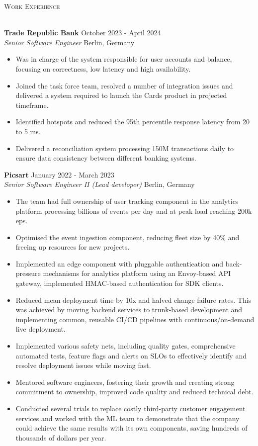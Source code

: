 \documentclass[a4paper]{article}
\newcommand{\lineunder} {
    \vspace*{-8pt} \\
    \hspace*{-18pt} \hrulefill \\
}
\newcommand{\header} [1] {
        {\hspace*{-18pt}\vspace*{6pt} \textsc{#1}}
    \vspace*{-6pt} \lineunder
}
\newcommand{\employer} [4] {
    \textbf{#1} \hfill {#3} \\
    \textit{#2} \hfill {#4} \\
    \vspace{0mm}
}
\begin{document}
    \header{Work Experience}
    \vspace{1mm}

    \employer{Trade Republic Bank}{Senior Software Engineer}{October 2023 - April 2024}{Berlin, Germany}
    \begin{itemize}[itemsep=-1mm]
        \item Was in charge of the system responsible for user accounts and balance, focusing on correctness, low latency and high availability.
        \item Joined the task force team, resolved a number of integration issues and delivered a system required to launch the Cards product in projected timeframe.
        \item Identified hotspots and reduced the 95th percentile response latency from 20 to 5 ms.
        \item Delivered a reconciliation system processing 150M transactions daily to ensure data consistency between different banking systems.
    \end{itemize}

    \employer{Picsart}{Senior Software Engineer II (Lead developer)}{January 2022 - March 2023}{Berlin, Germany}
    \begin{itemize}[itemsep=-1mm]
        \item The team had full ownership of user tracking component in the analytics platform processing billions
        of events per day and at peak load reaching 200k eps.
        \item Optimised the event ingestion component, reducing fleet size by 40\% and freeing up resources for new projects.
        \item Implemented an edge component with pluggable authentication and back-pressure mechanisms for analytics platform
        using an Envoy-based API gateway, implemented HMAC-based authentication for SDK clients.
        \item Reduced mean deployment time by 10x and halved change failure rates.
        This was achieved by moving backend services to trunk-based development and implementing common, reusable CI/CD pipelines with
        continuous/on-demand live deployment.
        \item Implemented various safety nets, including quality gates, comprehensive automated tests,
        feature flags and alerts on SLOs to effectively identify and resolve deployment issues while moving fast.
        \item Mentored software engineers, fostering their growth and creating strong commitment to ownership,
        improved code quality and reduced technical debt.
        \item Conducted several trials to replace costly third-party customer engagement services
        and worked with the ML team to demonstrate that the company could achieve the same results with its own components,
        saving hundreds of thousands of dollars per year.
    \end{itemize}
\end{document}
